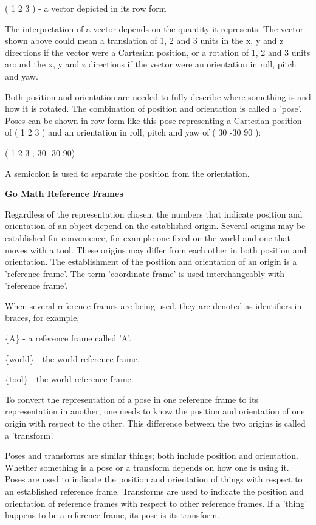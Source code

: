( 1 2 3 ) -\/ a vector depicted in its row form

The interpretation of a vector depends on the quantity it represents. The vector shown above could mean a translation of 1, 2 and 3 units in the x, y and z directions if the vector were a Cartesian position, or a rotation of 1, 2 and 3 units around the x, y and z directions if the vector were an orientation in roll, pitch and yaw.

Both position and orientation are needed to fully describe where something is and how it is rotated. The combination of position and orientation is called a 'pose'. Poses can be shown in row form like this pose representing a Cartesian position of ( 1 2 3 ) and an orientation in roll, pitch and yaw of ( 30 -\/30 90 )\-:

( 1 2 3 ; 30 -\/30 90)

A semicolon is used to separate the position from the orientation.

{\bfseries Go Math Reference Frames}

Regardless of the representation chosen, the numbers that indicate position and orientation of an object depend on the established origin. Several origins may be established for convenience, for example one fixed on the world and one that moves with a tool. These origins may differ from each other in both position and orientation. The establishment of the position and orientation of an origin is a 'reference frame'. The term 'coordinate frame' is used interchangeably with 'reference frame'.

When several reference frames are being used, they are denoted as identifiers in braces, for example,

\{A\} -\/ a reference frame called 'A'.

\{world\} -\/ the world reference frame.

\{tool\} -\/ the world reference frame.

To convert the representation of a pose in one reference frame to its representation in another, one needs to know the position and orientation of one origin with respect to the other. This difference between the two origins is called a 'transform'.

Poses and transforms are similar things; both include position and orientation. Whether something is a pose or a transform depends on how one is using it. Poses are used to indicate the position and orientation of things with respect to an established reference frame. Transforms are used to indicate the position and orientation of reference frames with respect to other reference frames. If a 'thing' happens to be a reference frame, its pose is its transform.

